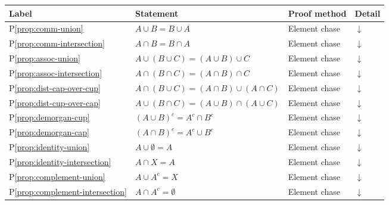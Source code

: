 
\begin{tcolorbox}[colback=gray!6, colframe=gray!40, arc=2pt,
  left=6pt, right=6pt, top=4pt, bottom=4pt,
  title={\small\textbf{Section Toolkit --- Quick Reference}},
  fonttitle=\small\bfseries]
\small
\begin{tabular}{l l l l}
\toprule
\textbf{Label} & \textbf{Statement} & \textbf{Proof method} & \textbf{Detail} \\
\midrule
P\ref{prop:comm-union}
  & $A\cup B = B\cup A$
  & Element chase & \hyperref[prf:comm-union]{$\downarrow$} \\
P\ref{prop:comm-intersection}
  & $A\cap B = B\cap A$
  & Element chase & \hyperref[prf:comm-intersection]{$\downarrow$} \\
P\ref{prop:assoc-union}
  & $A\cup(B\cup C) = (A\cup B)\cup C$
  & Element chase & \hyperref[prf:assoc-union]{$\downarrow$} \\
P\ref{prop:assoc-intersection}
  & $A\cap(B\cap C) = (A\cap B)\cap C$
  & Element chase & \hyperref[prf:assoc-intersection]{$\downarrow$} \\
P\ref{prop:dist-cap-over-cup}
  & $A\cap(B\cup C) = (A\cap B)\cup(A\cap C)$
  & Element chase & \hyperref[prf:dist-cap-over-cup]{$\downarrow$} \\
P\ref{prop:dist-cup-over-cap}
  & $A\cup(B\cap C) = (A\cup B)\cap(A\cup C)$
  & Element chase & \hyperref[prf:dist-cup-over-cap]{$\downarrow$} \\
P\ref{prop:demorgan-cup}
  & $(A\cup B)^c = A^c\cap B^c$
  & Element chase & \hyperref[prf:demorgan-cup]{$\downarrow$} \\
P\ref{prop:demorgan-cap}
  & $(A\cap B)^c = A^c\cup B^c$
  & Element chase & \hyperref[prf:demorgan-cap]{$\downarrow$} \\
P\ref{prop:identity-union}
  & $A\cup\emptyset = A$
  & Element chase & \hyperref[prf:identity-union]{$\downarrow$} \\
P\ref{prop:identity-intersection}
  & $A\cap X = A$
  & Element chase & \hyperref[prf:identity-intersection]{$\downarrow$} \\
P\ref{prop:complement-union}
  & $A\cup A^c = X$
  & Element chase & \hyperref[prf:complement-union]{$\downarrow$} \\
P\ref{prop:complement-intersection}
  & $A\cap A^c = \emptyset$
  & Element chase & \hyperref[prf:complement-intersection]{$\downarrow$} \\

\end{tabular}
\end{tcolorbox}
